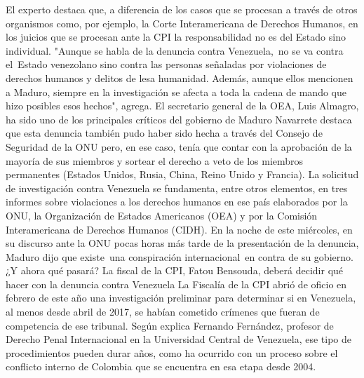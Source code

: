 \documentclass{article}%
\begin{document}
\newline%
%
El experto destaca que, a diferencia de los casos que se procesan a través de otros organismos como, por ejemplo, la Corte Interamericana de Derechos Humanos, en los juicios que se procesan ante la CPI la responsabilidad no es del Estado sino individual.%
\newline%
%
"Aunque se habla de la denuncia contra Venezuela,~no se va contra el~Estado venezolano sino contra las personas señaladas por violaciones de derechos humanos y delitos de lesa humanidad. Además, aunque ellos mencionen a Maduro, siempre en la investigación se afecta a toda la cadena de mando que hizo posibles esos hechos", agrega.%
\newline%
%
El secretario general de la OEA, Luis Almagro, ha sido uno de los principales críticos del gobierno de Maduro%
\newline%
%
Navarrete destaca que esta denuncia también pudo haber sido hecha a través del Consejo de Seguridad de la ONU pero, en ese caso, tenía que contar con la aprobación de la mayoría de sus miembros y sortear el derecho a veto de los miembros permanentes (Estados Unidos, Rusia, China, Reino Unido y Francia).%
\newline%
%
La solicitud de investigación contra Venezuela se fundamenta, entre otros elementos, en tres informes sobre violaciones a los derechos humanos en ese país elaborados por la ONU, la Organización de Estados Americanos (OEA) y por la Comisión Interamericana de Derechos Humanos (CIDH).%
\newline%
%
En la noche de este miércoles, en su discurso ante la ONU pocas horas más tarde de la presentación de la denuncia, Maduro dijo que existe~una conspiración internacional~en contra de su gobierno.%
\newline%
%
¿Y ahora qué pasará?%
\newline%
%
La fiscal de la CPI, Fatou Bensouda, deberá decidir qué hacer con la denuncia contra Venezuela%
\newline%
%
La Fiscalía de la CPI abrió de oficio en febrero de este año una investigación preliminar para determinar si en Venezuela, al menos desde abril de 2017, se habían cometido crímenes que fueran de competencia de ese tribunal.%
\newline%
%
Según explica Fernando Fernández, profesor de Derecho Penal Internacional en la Universidad Central de Venezuela, ese tipo de procedimientos pueden durar años, como ha ocurrido con un proceso sobre el conflicto interno de Colombia que se encuentra en esa etapa desde 2004.%
\end{document}
